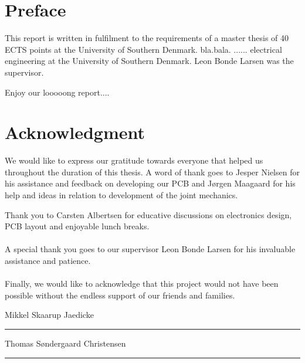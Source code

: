 
\section*{Preface}
This report is written in fulfilment to the requirements of a master thesis of 40 ECTS points at the University of Southern Denmark.
bla.bala. 
 ...... electrical engineering at the University of Southern Denmark.
Leon Bonde Larsen was the supervisor.


Enjoy our looooong report....


\section*{Acknowledgment}

We would like to express our gratitude towards everyone that helped us throughout the duration of this thesis.
A word of thank goes to Jesper Nielsen for his assistance and feedback on developing our PCB and Jørgen Maagaard for his help and ideas in relation to development of the joint mechanics. 

Thank you to Carsten Albertsen for educative discussions on electronics design, PCB layout and enjoyable lunch breaks. 
\\~\\
A special thank you goes to our supervisor Leon Bonde Larsen for his invaluable assistance and patience.
\\~\\
Finally, we would like to acknowledge that this project would not have been possible without the endless support of our friends and families.


\vspace{1cm}
\begin{center}
	\begin{minipage}[t]{.49\textwidth}\large
		\begin{center}
		Mikkel Skaarup Jaedicke\\
		\vspace{1cm}
		\hrule
		\vspace{0.5cm}
		Thomas Søndergaard Christensen
		\vspace{1cm}
		\hrule
		\end{center} 
	\end{minipage}
\end{center}

